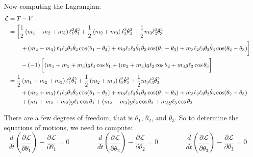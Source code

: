\documentclass[letterpaper,8pt]{article}
\begin{document}
Now computing the Lagrangian:
\begin{align*}
\mathcal{L} &= T - V \\
   &= \left[ \frac{1}{2} \left( m_1 + m_2 + m_3 \right) \ell_1^2 \dot{\theta}_1^2
                                      + \frac{1}{2} \left( m_2 + m_3 \right) \ell_2^2 \dot{\theta}_2^2
                                      + \frac{1}{2} m_3 \ell_3^2 \dot{\theta}_3^2 \right. \\
   & \qquad \left. + \left( m_2 + m_3 \right) \ell_1\ell_2\dot{\theta}_1\dot{\theta}_2 \cos (\theta_1 - \theta_2)
            + m_3 \ell_1\ell_3\dot{\theta}_1\dot{\theta}_3 \cos(\theta_1 - \theta_3)
            + m_3 \ell_2\ell_3\dot{\theta}_2\dot{\theta}_3 \cos(\theta_2 - \theta_3) \vphantom{\frac{1}{1}} \right] \\
   & \qquad - (-1) \left[ \vphantom{\frac{1}{1}} (m_1 + m_2 + m_3)g \ell_1 \cos \theta_1 + (m_2 + m_3) g \ell_2 \cos \theta_2 + m_3 g \ell_3 \cos \theta_3 \right] \\
   &= \frac{1}{2} \left( m_1 + m_2 + m_3 \right) \ell_1^2 \dot{\theta}_1^2  
                                      + \frac{1}{2} \left( m_2 + m_3 \right) \ell_2^2 \dot{\theta}_2^2
                                      + \frac{1}{2} m_3 \ell_3^2 \dot{\theta}_3^2 \\
   & \qquad + \left( m_2 + m_3 \right) \ell_1\ell_2\dot{\theta}_1\dot{\theta}_2 \cos (\theta_1 - \theta_2)
            + m_3 \ell_1\ell_3\dot{\theta}_1\dot{\theta}_3 \cos(\theta_1 - \theta_3)
            + m_3 \ell_2\ell_3\dot{\theta}_2\dot{\theta}_3 \cos(\theta_2 - \theta_3) \\
   & \qquad + (m_1 + m_2 + m_3)g \ell_1 \cos \theta_1 + (m_2 + m_3) g \ell_2 \cos \theta_2 + m_3 g \ell_3 \cos \theta_3 \\
\end{align*}


There are a few degrees of freedom, that is $\theta_1$, $\theta_2$, and $\theta_3$.  So to determine the equations of motions, we need
to compute:
\[
\frac{d}{dt}\left( \frac{\partial\mathcal{L}}{\partial \dot{\theta}_1} \right) - 
\frac{\partial\mathcal{L}}{\partial \theta_1} = 0 
\qquad\qquad
\frac{d}{dt}\left( \frac{\partial\mathcal{L}}{\partial \dot{\theta}_2} \right) - 
\frac{\partial\mathcal{L}}{\partial \theta_2} = 0 
\qquad\qquad
\frac{d}{dt}\left( \frac{\partial\mathcal{L}}{\partial \dot{\theta}_3} \right) - 
\frac{\partial\mathcal{L}}{\partial \theta_3} = 0 
\] 
\end{document}
